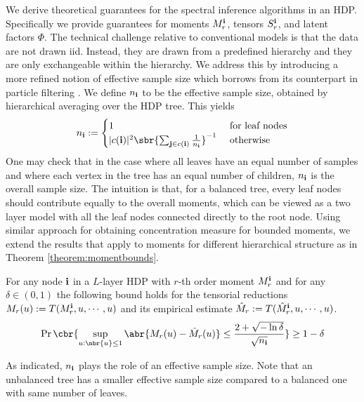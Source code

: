 \documentclass[twoside,11pt]{article}
\newcommand{\ib}{{\bf i}}
\newcommand{\jb}{{\bf j}}
\begin{document}
{We derive theoretical guarantees for the spectral inference algorithms
in an HDP. Specifically we provide guarantees for moments $M_r^{\ib}$,
tensors $S_r^{\ib}$, and latent factors $\Phi$. The technical
challenge relative to conventional models is that the data are not
drawn iid. Instead, they are drawn from a predefined hierarchy and
they are only exchangeable within the hierarchy. We address this by
introducing a more refined notion of effective sample size which
borrows from its counterpart in particle filtering \citep{DouFreGor01}.
We define $n_\ib$ to be the effective sample
size, obtained by hierarchical averaging over the HDP tree. This yields
\begin{align}
  \label{eq:nibr}
  n_\ib := \begin{cases}
    1 & \text{ for leaf nodes}
    \\
    |c(\ib)|^2 \sbr{\sum_{\jb \in c(\ib)} \frac{1}{n_\ib}}^{-1}
    & \text{ otherwise}
  \end{cases}
\end{align}
One may check that in the case where all leaves have an equal number
of samples and where each vertex in the tree has an equal number of
children, $n_{\ib}$ is the overall sample size. The intuition is that, for a balanced tree, every leaf nodes should contribute equally to the overall moments, which can be viewed as a two layer model with all the leaf nodes connected directly to the root node. Using similar approach for obtaining concentration measure for bounded moments, we extend the results that apply to moments for different hierarchical structure as in Theorem \ref{theorem:momentbounds}. 

\begin{theorem}
\label{theorem:momentbounds}
For any node $\ib$ in a $L$-layer HDP with $r$-th order moment
$M_r^{\ib}$ and for any $\delta \in (0,1)$ the following bound holds
for the tensorial reductions $M_r(u) :=T(M_r^{\ib}, u, \cdots, u)$ and
its empirical estimate $\hat{M}_r := T(\hat{M}_r^{\ib}, u, \cdots, u)$.
\begin{align}
  \nonumber
  \Pr\cbr{\sup_{u: \nbr{u} \leq 1} \abr{ M_r(u)-\hat{M}_r(u)} \leq
    \frac{2 + \sqrt{-\ln \delta}}{\sqrt{n_\ib}}} \geq 1 - \delta 
\end{align}
\end{theorem}
As indicated, $n_\ib$ plays the role of an effective sample
size. Note that an unbalanced tree has a smaller effective sample size
compared to a balanced one with same number of leaves.  

}
\end{document}
